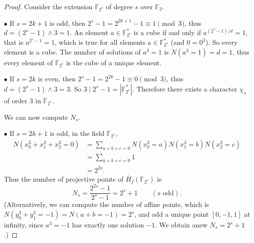 \documentclass[11pt,a4paper]{article}
\newcommand{\F}{\mathbb{F}}
\begin{document}
\begin{proof} Consider the extension $\F_{2^s}$ of degree $s$ over $\F_2$.
\item[$\bullet$] If $s = 2k+1$ is odd, then $2^s - 1 = 2^{2k+1} - 1 \equiv 1 \pmod 3$, thus $d = (2^s-1) \wedge 3 = 1$. An element $a \in \F_{2^s}^*$ is a cube if and only if $a^{(2^s-1)/d} = 1$, that is $a^{2^s-1} = 1$, which is true for all elements $a \in \F_{2^s}^*$ (and $0 = 0^3$). So every element is a cube. The number of solutions of $a^3 = 1$ is $N(a^3 = 1) =d = 1$, thus every element of $\F_{2^s}$ is the cube of a unique element.

\item[$\bullet$] If $s = 2k$ is even, then $2^s - 1 = 2^{2k}- 1 \equiv 0 \pmod 3$, thus $d = (2^s-1) \wedge 3 = 3$. So $3 \mid 2^s-1 = |\F_{2^s}^*|$. Therefore there exists a character $\chi_s$ of order $3$ in $\F_{2^s}$.

\bigskip

We can now compute $N_s$.

\item[$\bullet$] If $s = 2k+1$ is odd, in the field $\F_{2^s}$,
\begin{align*}
N(x_0^3 + x_1^3 + x_2^3 = 0) &= \sum_{a+b+c = 0} N(x_0^3 = a) N(x_1^3 = b) N(x_2^3 = c)\\
&= \sum_{a+b+c = 0} 1\\
&= 2^{2s}.
\end{align*}
Thus the number of projective points of $\overline{H}_f(\F_{2^s})$ is
$$N_s = \frac{2^{2s}- 1}{2^s -1} = 2^s + 1\qquad (s \text{ odd}).$$
(Alternatively, we can compute the number of affine points, which is $N(y_0^3 +y_1^3 = -1) = N(a+b = -1) = 2^s$, and add a unique point $[0,-1,1]$ at infinity, since $a^3 = -1$ has exactly one solution $-1$. We obtain anew $N_s = 2^s +1$.)


\end{proof}
\end{document}
